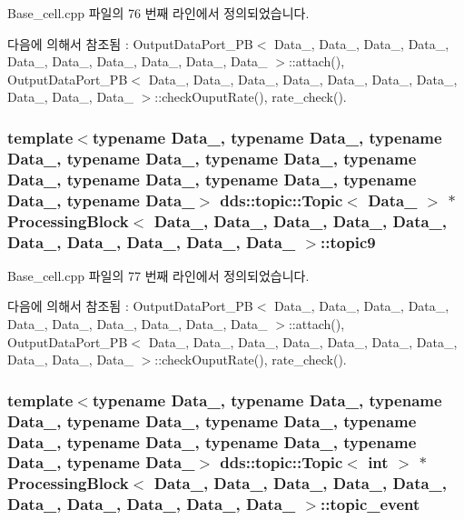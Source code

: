 Base\+\_\+cell.\+cpp 파일의 76 번째 라인에서 정의되었습니다.



다음에 의해서 참조됨 \+:  Output\+Data\+Port\+\_\+\+P\+B$<$ Data\+\_, Data\+\_, Data\+\_, Data\+\_, Data\+\_, Data\+\_, Data\+\_, Data\+\_, Data\+\_, Data\+\_ $>$\+::attach(), Output\+Data\+Port\+\_\+\+P\+B$<$ Data\+\_, Data\+\_, Data\+\_, Data\+\_, Data\+\_, Data\+\_, Data\+\_, Data\+\_, Data\+\_, Data\+\_ $>$\+::check\+Ouput\+Rate(), rate\+\_\+check().

\subsubsection[{\texorpdfstring{topic9}{topic9}}]{\setlength{\rightskip}{0pt plus 5cm}template$<$typename Data\+\_, typename Data\+\_, typename Data\+\_, typename Data\+\_, typename Data\+\_, typename Data\+\_, typename Data\+\_, typename Data\+\_, typename Data\+\_, typename Data\+\_$>$ dds\+::topic\+::\+Topic$<$ Data\+\_ $>$ $\ast$ {\bf Processing\+Block}$<$ Data\+\_, Data\+\_, Data\+\_, Data\+\_, Data\+\_, Data\+\_, Data\+\_, Data\+\_, Data\+\_, Data\+\_ $>$\+::topic9}\hypertarget{classProcessingBlock_a375c0e7c0702a1fdd547d3d82a417e61}{}\label{classProcessingBlock_a375c0e7c0702a1fdd547d3d82a417e61}


Base\+\_\+cell.\+cpp 파일의 77 번째 라인에서 정의되었습니다.



다음에 의해서 참조됨 \+:  Output\+Data\+Port\+\_\+\+P\+B$<$ Data\+\_, Data\+\_, Data\+\_, Data\+\_, Data\+\_, Data\+\_, Data\+\_, Data\+\_, Data\+\_, Data\+\_ $>$\+::attach(), Output\+Data\+Port\+\_\+\+P\+B$<$ Data\+\_, Data\+\_, Data\+\_, Data\+\_, Data\+\_, Data\+\_, Data\+\_, Data\+\_, Data\+\_, Data\+\_ $>$\+::check\+Ouput\+Rate(), rate\+\_\+check().

\subsubsection[{\texorpdfstring{topic\+\_\+event}{topic_event}}]{\setlength{\rightskip}{0pt plus 5cm}template$<$typename Data\+\_, typename Data\+\_, typename Data\+\_, typename Data\+\_, typename Data\+\_, typename Data\+\_, typename Data\+\_, typename Data\+\_, typename Data\+\_, typename Data\+\_$>$ dds\+::topic\+::\+Topic$<$ int $>$ $\ast$ {\bf Processing\+Block}$<$ Data\+\_, Data\+\_, Data\+\_, Data\+\_, Data\+\_, Data\+\_, Data\+\_, Data\+\_, Data\+\_, Data\+\_ $>$\+::topic\+\_\+event}\hypertarget{classProcessingBlock_ab82f4558edda184aa0519606f31c16f9}{}\label{classProcessingBlock_ab82f4558edda184aa0519606f31c16f9}


